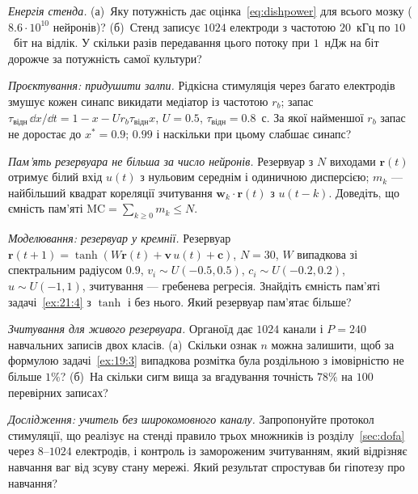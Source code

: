 \begin{exercise}[\lvlA]
\label{ex:21:2}
\emph{Енергія стенда.} (а)~Яку потужність дає оцінка~\eqref{eq:dishpower} для всього мозку ($8.6\cdot10^{10}$ нейронів)? (б)~Стенд записує $1024$ електроди з частотою $20$~кГц по $10$~біт на відлік. У скільки разів передавання цього потоку при $1$~нДж на біт дорожче за потужність самої культури?
\end{exercise}

\begin{exercise}[\lvlB]
\label{ex:21:3}
\emph{Проєктування: придушити залпи.} Рідкісна стимуляція через багато електродів змушує кожен синапс викидати медіатор із частотою $r_b$; запас $\tau_{\text{відн}}\,\dd x/\dd t=1-x-Ur_b\tau_{\text{відн}}x$, $U=0.5$, $\tau_{\text{відн}}=0.8$~с. За якої найменшої $r_b$ запас не доростає до $x^*=0.9$; $0.99$ і наскільки при цьому слабшає синапс?
\end{exercise}

\begin{exercise}[\lvlB]
\label{ex:21:4}
\emph{Пам'ять резервуара не більша за число нейронів.} Резервуар з $N$ виходами $\mathbf r(t)$ отримує білий вхід $u(t)$ з нульовим середнім і одиничною дисперсією; $m_k$ --- найбільший квадрат кореляції зчитування $\mathbf w_k\cdot\mathbf r(t)$ з $u(t-k)$. Доведіть, що ємність пам'яті $\mathrm{MC}=\sum_{k\ge0}m_k\le N$.
\end{exercise}

\begin{exercise}[\lvlB]
\label{ex:21:5}
\emph{Моделювання: резервуар у кремнії.} Резервуар $\mathbf r(t+1)=\tanh(W\mathbf r(t)+\mathbf v\,u(t)+\mathbf c)$, $N=30$, $W$ випадкова зі спектральним радіусом $0.9$, $v_i\sim U(-0.5,0.5)$, $c_i\sim U(-0.2,0.2)$, $u\sim U(-1,1)$, зчитування --- гребенева регресія. Знайдіть ємність пам'яті задачі~\ref{ex:21:4} з $\tanh$ і без нього. Який резервуар пам'ятає більше?
\end{exercise}

\begin{exercise}[\lvlB]
\label{ex:21:6}
\emph{Зчитування для живого резервуара.} Органоїд дає $1024$ канали і $P=240$ навчальних записів двох класів. (а)~Скільки ознак $n$ можна залишити, щоб за формулою задачі~\ref{ex:19:3} випадкова розмітка була роздільною з імовірністю не більше $1\%$? (б)~На скільки сигм вища за вгадування точність $78\%$ на $100$ перевірних записах?
\end{exercise}

\begin{exercise}[\lvlC]
\label{ex:21:7}
\emph{Дослідження: учитель без широкомовного каналу.} Запропонуйте протокол стимуляції, що реалізує на стенді правило трьох множників із розділу~\ref{sec:dofa} через $8$--$1024$ електродів, і контроль із замороженим зчитуванням, який відрізняє навчання ваг від зсуву стану мережі. Який результат спростував би гіпотезу про навчання?
\end{exercise}
